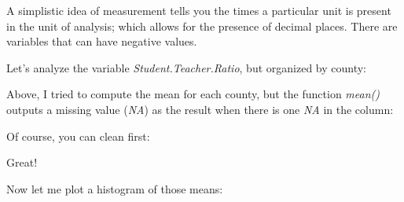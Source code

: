 \documentclass[]{article}
\newenvironment{Shaded}{\begin{snugshade}}{\end{snugshade}}
\newcommand{\KeywordTok}[1]{\textcolor[rgb]{0.13,0.29,0.53}{\textbf{#1}}}
\newcommand{\DataTypeTok}[1]{\textcolor[rgb]{0.13,0.29,0.53}{#1}}
\newcommand{\CommentTok}[1]{\textcolor[rgb]{0.56,0.35,0.01}{\textit{#1}}}
\newcommand{\OperatorTok}[1]{\textcolor[rgb]{0.81,0.36,0.00}{\textbf{#1}}}
\newcommand{\NormalTok}[1]{#1}
\begin{document}
A simplistic idea of measurement tells you the times a particular unit
is present in the unit of analysis; which allows for the presence of
decimal places. There are variables that can have negative values.

Let's analyze the variable \emph{Student.Teacher.Ratio}, but organized
by county:

\begin{Shaded}
\end{Shaded}

Above, I tried to compute the mean for each county, but the function
\emph{mean()} outputs a missing value (\emph{NA}) as the result when
there is one \emph{NA} in the column:

\begin{Shaded}
\end{Shaded}

Of course, you can clean first:

\begin{Shaded}
\end{Shaded}

Great!

Now let me plot a histogram of those means:

\begin{Shaded}
\end{Shaded}
\end{document}
